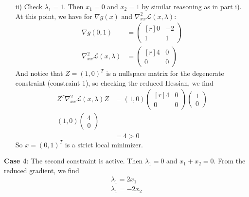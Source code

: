 \documentclass{article}
\begin{document}
\begin{itemize}
\begin{itemize}
\begin{itemize}
            \item[ii)] Check $\lambda_1 = 1$. Then $x_1 = 0$ and $x_2 = 1$ by similar reasoning as in part i). At this point, we have for $\nabla g(x)$ and $\nabla_{xx}^2\mathscr{L}(x,\lambda)$:
            \begin{align*}
                \nabla g(0,1) &= \begin{pmatrix*}[r]
                    0 & -2\\
                    1 & 1
                \end{pmatrix*}\\
                \nabla_{xx}^2\mathscr{L}(x,\lambda) &= \begin{pmatrix*}[r]
                    4 & 0\\
                    0 & 0
                \end{pmatrix*}
            \end{align*}
            And notice that $Z = (1,0)^T$ is a nullspace matrix for the degenerate constraint (constraint 1), so checking the reduced Hessian, we find
            \begin{align*}
                Z^T\nabla_{xx}^2\mathscr{L}(x,\lambda)Z &= (1,0)\begin{pmatrix*}[r]
                    4 & 0\\
                    0 & 0
                \end{pmatrix*}\begin{pmatrix}
                    1\\
                    0
                \end{pmatrix}\\
                (1,0)\begin{pmatrix}
                    4\\
                    0
                \end{pmatrix}\\
                &= 4 > 0
            \end{align*}
            So $x = (0,1)^T$ is a strict local minimizer.
        \end{itemize}
        \textbf{Case 4}: The second constraint is active. 
        \newline
        Then $\lambda_1 = 0$ and $x_1 + x_2 = 0$. 
        \newline
        From the reduced gradient, we find
        \begin{align*}
            \lambda_1 = 2x_1\\
            \lambda_1 = -2x_2

\end{align*}
\end{itemize}
\end{itemize}
\end{document}
